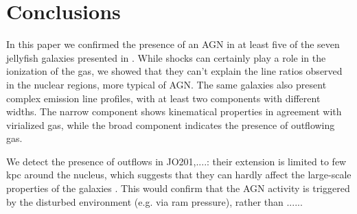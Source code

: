 \documentclass[fleqn,usenatbib]{mnras}
\begin{document}



\section{Conclusions}

In this paper we confirmed the presence of an AGN  in at least five of the seven jellyfish galaxies presented in \citep{2017Natur.548..304P}. While shocks can certainly play a role in the ionization of the gas, we showed that they can't explain the line ratios observed in the nuclear regions, more typical of AGN. The same galaxies also present complex emission line profiles, with at least two components with different widths. The narrow component shows kinematical properties in agreement with virialized gas, while the broad component indicates the presence of outflowing gas. 


We detect the presence of outflows in JO201,....: their extension is limited to few kpc around the nucleus, which suggests that they can hardly affect the large-scale properties of the galaxies \citep{2016ApJ...819..148K}. This would confirm that the AGN activity is triggered by the disturbed environment (e.g. via ram pressure), rather than ......
\end{document}
